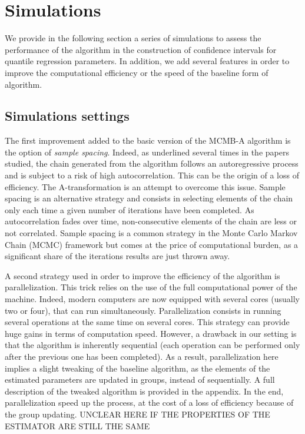 \documentclass[11pt]{article}
\begin{document}
\section{Simulations}

We provide in the following section a series of simulations to assess the performance of the algorithm in the construction of confidence intervals for quantile regression parameters. In addition, we add several features in order to improve the computational efficiency or the speed of the baseline form of algorithm.\medskip


\subsection{Simulations settings}

The first improvement added to the basic version of the MCMB-A algorithm is the option of \textit{sample spacing}. Indeed, as underlined several times in the papers studied, the chain generated from the algorithm follows an autoregressive process and is subject to a risk of high autocorrelation. This can be the origin of a loss of efficiency. The A-transformation is an attempt to overcome this issue. Sample spacing is an alternative strategy and consists in selecting elements of the chain only each time a given number of iterations have been completed. As autocorrelation fades over time, non-consecutive elements of the chain are less or not correlated. Sample spacing is a common strategy in the Monte Carlo Markov Chain (MCMC) framework but comes at the price of computational burden, as a significant share of the iterations results are just thrown away.\smallskip

A second strategy used in order to improve the efficiency of the algorithm is parallelization. This trick relies on the use of the full computational power of the machine. Indeed, modern computers are now equipped with several cores (usually two or four), that can run simultaneously. Parallelization consists in running several operations at the same time on several cores. This strategy can provide huge gains in terms of computation speed. However, a drawback in our setting is that the algorithm is inherently sequential (each operation can be performed only after the previous one has been completed). As a result, parallelization here implies a slight tweaking of the baseline algorithm, as the elements of the estimated parameters are updated in groups, instead of sequentially. A full description of the tweaked algorithm is provided in the appendix. In the end, parallelization speed up the process, at the cost of a loss of efficiency because of the group updating. UNCLEAR HERE IF THE PROPERTIES OF THE ESTIMATOR ARE STILL THE SAME\smallskip
\end{document}
